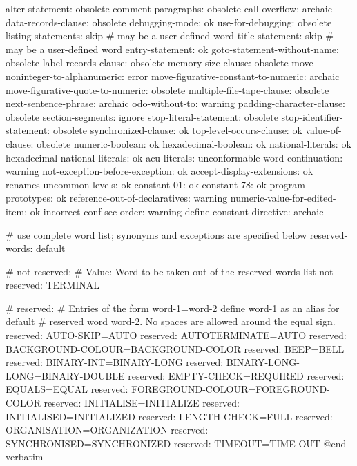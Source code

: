 alter-statement:			obsolete
comment-paragraphs:			obsolete
call-overflow:				archaic
data-records-clause:			obsolete
debugging-mode:				ok
use-for-debugging:			obsolete
listing-statements:			skip	# may be a user-defined word
title-statement:			skip	# may be a user-defined word
entry-statement:			ok
goto-statement-without-name:		obsolete
label-records-clause:			obsolete
memory-size-clause:			obsolete
move-noninteger-to-alphanumeric:	error
move-figurative-constant-to-numeric:	archaic
move-figurative-quote-to-numeric:	obsolete
multiple-file-tape-clause:		obsolete
next-sentence-phrase:			archaic
odo-without-to:				warning
padding-character-clause:		obsolete
section-segments:			ignore
stop-literal-statement:			obsolete
stop-identifier-statement:		obsolete
synchronized-clause:			ok
top-level-occurs-clause:		ok
value-of-clause:			obsolete
numeric-boolean:			ok
hexadecimal-boolean:			ok
national-literals:			ok
hexadecimal-national-literals:		ok
acu-literals:			unconformable
word-continuation:			warning
not-exception-before-exception:		ok
accept-display-extensions:		ok
renames-uncommon-levels:		ok
constant-01:				ok
constant-78:				ok
program-prototypes:			ok
reference-out-of-declaratives:		warning
numeric-value-for-edited-item:		ok
incorrect-conf-sec-order:		warning
define-constant-directive:		archaic


# use complete word list; synonyms and exceptions are specified below
reserved-words:		default

# not-reserved:
# Value: Word to be taken out of the reserved words list
not-reserved:	TERMINAL

# reserved:
#   Entries of the form word-1=word-2 define word-1 as an alias for default
# reserved word word-2. No spaces are allowed around the equal sign.
reserved:	AUTO-SKIP=AUTO
reserved:	AUTOTERMINATE=AUTO
reserved:	BACKGROUND-COLOUR=BACKGROUND-COLOR
reserved:	BEEP=BELL
reserved:	BINARY-INT=BINARY-LONG
reserved:	BINARY-LONG-LONG=BINARY-DOUBLE
reserved:	EMPTY-CHECK=REQUIRED
reserved:	EQUALS=EQUAL
reserved:	FOREGROUND-COLOUR=FOREGROUND-COLOR
reserved:	INITIALISE=INITIALIZE
reserved:	INITIALISED=INITIALIZED
reserved:	LENGTH-CHECK=FULL
reserved:	ORGANISATION=ORGANIZATION
reserved:	SYNCHRONISED=SYNCHRONIZED
reserved:	TIMEOUT=TIME-OUT
@end verbatim
